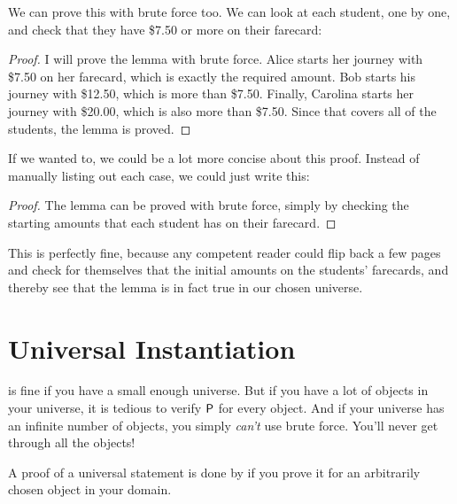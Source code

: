 \documentclass[../../../main.tex]{subfiles}
\begin{document}
We can prove this with brute force too. We can look at each student, one by one, and check that they have \$7.50 or more on their farecard:

\begin{framed}
  \begin{proof}
    I will prove the lemma with brute force. Alice starts her journey with \$7.50 on her farecard, which is exactly the required amount. Bob starts his journey with \$12.50, which is more than \$7.50. Finally, Carolina starts her journey with \$20.00, which is also more than \$7.50. Since that covers all of the students, the lemma is proved.
  \end{proof}
\end{framed}

If we wanted to, we could be a lot more concise about this proof. Instead of manually listing out each case, we could just write this:

\begin{framed}
  \begin{proof}
    The lemma can be proved with brute force, simply by checking the starting amounts that each student has on their farecard.
  \end{proof}
\end{framed}

This is perfectly fine, because any competent reader could flip back a few pages and check for themselves that the initial amounts on the students' farecards, and thereby see that the lemma is in fact true in our chosen universe.



\section{Universal Instantiation}

 is fine if you have a small enough universe. But if you have a lot of objects in your universe, it is tedious to verify $\P/$ for every object. And if your universe has an infinite number of objects, you simply \emph{can't} use brute force. You'll never get through all the objects!

\begin{terminology}
  A proof of a universal statement is done by  if you prove it for an arbitrarily chosen object in your domain.
\end{terminology}
\end{document}
